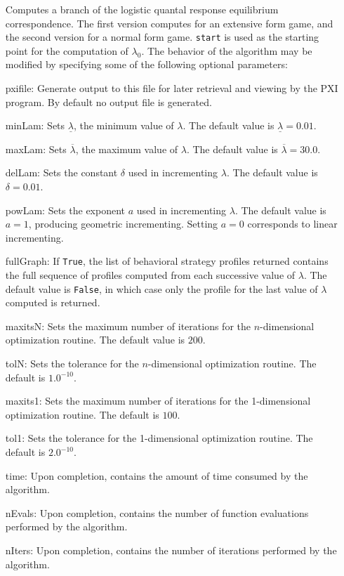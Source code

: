 \begin{itemize}
\bd 
Computes a branch of the logistic quantal response equilibrium
correspondence.  The first version computes for an extensive form
game, and the second version for a normal form game.  \verb+start+ is
used as the starting point for the computation of $\lambda_{0}$.  The
behavior of the algorithm may be modified by specifying some of the
following optional parameters:
\bd
\item
[pxifile:] Generate output to this file for later retrieval and viewing by
the PXI program.  By default no output file is generated.
\item
[minLam:] Sets $\underline{\lambda}$, the minimum value of $\lambda$.  The 
default value is $\underline{\lambda}=0.01$.
\item
[maxLam:] Sets $\overline{\lambda}$, the maximum value of $\lambda$.  The
default value is $\overline{\lambda}=30.0$.
\item
[delLam:] Sets the constant $\delta$ used in incrementing $\lambda$.  The
default value is $\delta=0.01$.
\item
[powLam:] Sets the exponent $a$ used in incrementing $\lambda$.  The default
value is $a=1$, producing geometric incrementing.  Setting $a=0$ corresponds
to linear incrementing.
\item
[fullGraph:] If \verb+True+, the list of behavioral strategy profiles
returned contains the full sequence of profiles computed from each successive
value of $\lambda$.  The default value is \verb+False+, in which case only
the profile for the last value of $\lambda$ computed is returned.
\item
[maxitsN:] Sets the maximum number of iterations for the $n$-dimensional
optimization routine.  The default value is $200$.
\item
[tolN:] Sets the tolerance for the $n$-dimensional optimization routine.
The default is $1.0^{-10}$.
\item
[maxits1:] Sets the maximum number of iterations for the 1-dimensional
optimization routine.  The default is $100$.
\item
[tol1:] Sets the tolerance for the 1-dimensional optimization routine.
The default is $2.0^{-10}$.
\item
[time:] Upon completion, contains the amount of time consumed by the
algorithm.
\item
[nEvals:] Upon completion, contains the number of function evaluations
performed by the algorithm.
\item
[nIters:] Upon completion, contains the number of iterations performed
by the algorithm.
\ed
\ed


\end{itemize}
